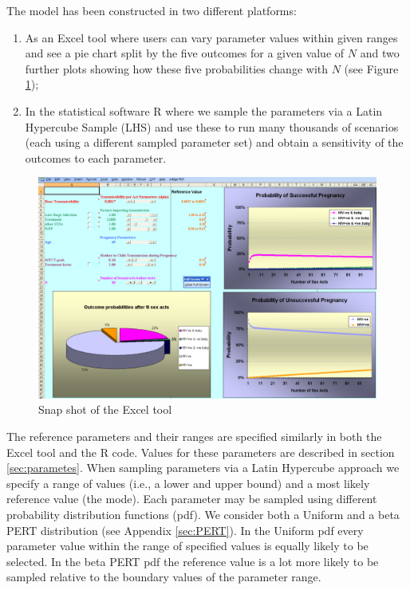 \documentclass[11pt]{nih_mod}
\begin{document}
The model has been constructed in two different platforms: 
\begin{enumerate}
	\item As an Excel tool where users can vary parameter values within given ranges and see a pie chart split by the five outcomes for a given value of $N$ and two further plots showing how these five probabilities change with $N$ (see Figure \ref{Fig:Exceltool}); 
	\item In the statistical software R where we sample the parameters via a Latin Hypercube Sample (LHS) and use these to run many thousands of scenarios (each using a different sampled parameter set) and obtain a sensitivity of the outcomes to each parameter.
\end{enumerate}

\begin{figure}[!ht]
  \begin{center}
    \includegraphics[width=7in]{figures/Exceltool.pdf}
  \end{center}
  \caption{Snap shot of the Excel tool}
  \label{Fig:Exceltool}
\end{figure}

The reference parameters and their ranges are specified similarly in both the Excel tool and the R code. Values for these parameters are described in section \ref{sec:parametes}. When sampling parameters via a Latin Hypercube approach we specify a range of values (i.e., a lower and upper bound) and a most likely reference value (the mode). Each parameter may be sampled using different probability distribution functions (pdf). We consider both a Uniform and a beta PERT distribution (see Appendix \ref{sec:PERT}). In the Uniform pdf every parameter value within the range of specified values is equally likely to be selected. In the beta PERT pdf the reference value is a lot more likely to be sampled relative to the boundary values of the parameter range.  
\end{document}
